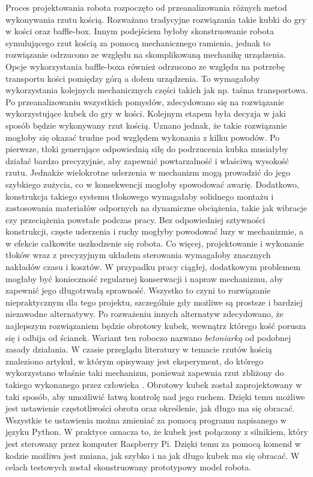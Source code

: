 Proces projektowania robota rozpoczęto od przeanalizowania różnych metod wykonywania rzutu kością. Rozważano tradycyjne rozwiązania takie kubki do gry w kości oraz baffle-box.
Innym podejściem byłoby skonstruowanie robota symulującego rzut kością za pomocą mechanicznego ramienia, jednak to rozwiązanie odrzucono ze względu na 
skomplikowaną mechanikę urządzenia. Opcje wykorzystania baffle-boxa również odrzucono ze względu na potrzebę transportu kości pomiędzy górą a dołem urządzenia. To wymagałoby
wykorzystania kolejnych mechanicznych części takich jak np. taśma transportowa.
Po przeanalizowaniu wszystkich pomysłów, zdecydowano się na rozwiązanie wykorzystujące kubek do gry w kości. Kolejnym etapem była decyzja w jaki sposób 
będzie wykonywany rzut kością. Uznano jednak, że takie rozwiązanie mogłoby się okazać trudne pod względem wykonania z kilku powodów. Po pierwsze, tłoki 
generujące odpowiednią siłę do podrzucenia kubka musiałyby działać bardzo precyzyjnie, aby zapewnić powtarzalność i właściwą wysokość rzutu. Jednakże 
wielokrotne uderzenia w mechanizm mogą prowadzić do jego szybkiego zużycia, co w konsekwencji mogłoby spowodować awarię.
Dodatkowo, konstrukcja takiego systemu tłokowego wymagałaby solidnego montażu i zastosowania materiałów odpornych na dynamiczne obciążenia, takie jak 
wibracje czy przeciążenia powstałe podczas pracy. Bez odpowiedniej sztywności konstrukcji, częste uderzenia i ruchy mogłyby powodować luzy w mechanizmie, 
a w efekcie całkowite uszkodzenie się robota.
Co więcej, projektowanie i wykonanie tłoków wraz z precyzyjnym układem sterowania wymagałoby znacznych nakładów czasu i kosztów. W przypadku pracy 
ciągłej, dodatkowym problemem mogłaby być konieczność regularnej konserwacji i napraw mechanizmu, aby zapewnić jego długotrwałą sprawność. Wszystko to 
czyni to rozwiązanie niepraktycznym dla tego projektu, szczególnie gdy możliwe są prostsze i bardziej niezawodne alternatywy. Po rozważeniu innych alternatyw
zdecydowano, że najlepszym rozwiązaniem będzie obrotowy kubek, wewnątrz którego kość porusza się i odbija od ścianek. Wariant ten roboczo nazwano \textit{betoniarką} od podobnej
zasady działania. W czasie przeglądu literatury w temacie rzutów kością znaleziono artykuł, w którym opisywany jest eksperyment, do którego wykorzystano właśnie taki 
mechanizm, ponieważ zapewnia rzut zbliżony do takiego wykonanego przez człowieka \cite{PK}. Obrotowy kubek został zaprojektowany w taki 
sposób, aby umożliwić łatwą kontrolę nad jego ruchem. Dzięki temu możliwe jest ustawienie częstotliwości obrotu oraz określenie, jak długo ma się obracać. Wszystkie te ustawienia 
można zmieniać za pomocą programu napisanego w języku Python. W praktyce oznacza to, że kubek jest połączony z silnikiem, który jest sterowany przez komputer 
Raspberry Pi. Dzięki temu za pomocą komend w kodzie możliwa jest zmiana, jak szybko i na jak długo kubek ma się obracać.
W celach testowych został skonstruowany prototypowy model robota.

